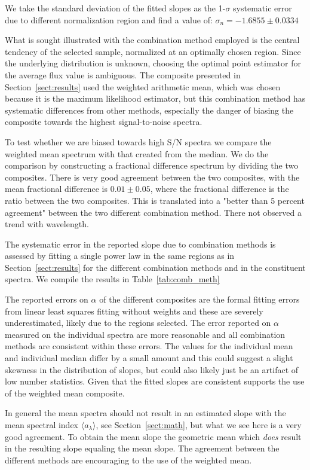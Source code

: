 \documentclass{aa}    %
\newcommand{\Tab}[1]{Table~\ref{tab:#1}}
\newcommand{\tab}[1]{\Tab{#1}}
\newcommand{\tablabel}[1]{\label{tab:#1}}
\newcommand{\sectionname}{Section}
\newcommand{\Sect}[1]{\sectionname~\ref{sect:#1}}
\newcommand{\sect}[1]{\Sect{#1}}
\begin{document}
We take the standard deviation of the fitted slopes as the 1-$\sigma$ systematic error due to different normalization region and find a value of: $\sigma_{n} = -1.6855 \pm 0.0334$


What is sought illustrated with the combination method employed is the central tendency of the selected sample, normalized at an optimally chosen region. Since the underlying distribution is unknown, choosing the optimal point estimator for the average flux value is ambiguous. The composite presented in \sect{results} used the weighted arithmetic mean, which was chosen because it is the maximum likelihood estimator, but this combination method has systematic differences from other methods, especially the danger of biasing the composite towards the highest signal-to-noise spectra. 

To test whether we are biased towards high S/N spectra we compare the weighted mean spectrum with that created from the median. We do the comparison by constructing a fractional difference spectrum by dividing the two composites. There is very good agreement between the two composites, with the mean fractional difference is $0.01 \pm 0.05$, where the fractional difference is the ratio between the two composites. This is translated into a "better than 5 percent agreement" between the two different combination method. There not observed a trend with wavelength.

The systematic error in the reported slope due to combination methods is assessed by fitting a single power law in the same regions as in \sect{results} for the different combination methods and in the constituent spectra. We compile the results in \tab{comb_meth}

 \tablabel{comb_meth} 

The reported errors on $\alpha$ of the different composites are the formal fitting errors from linear least squares fitting without weights and these are severely underestimated, likely due to the regions selected. The error reported on $\alpha$ measured on the individual spectra are more reasonable and all combination methods are consistent within these errors. The values for the individual mean and individual median differ by a small amount and this could suggest a slight skewness in the distribution of slopes, but could also likely just be an artifact of low number statistics. Given that the fitted slopes are consistent supports the use of the weighted mean composite.

In general the mean spectra should not result in an estimated slope with the mean spectral index $\langle a_\lambda\rangle$, see \sect{math}, but what we see here is a very good agreement. To obtain the mean slope the geometric mean which \textit{does} result in the resulting slope equaling the mean slope. The agreement between the different methods are encouraging to the use of the weighted mean.
\end{document}
